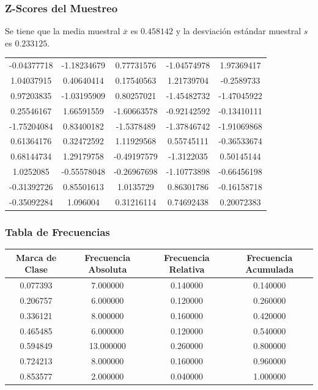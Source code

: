 \documentclass[12pt,a4paper]{article}
\begin{document}
    \subsubsection{Z-Scores del Muestreo}
        Se tiene que la media muestral $\overline{x}$ es $0.458142$ y la 
        desviación estándar muestral $s$ es $0.233125$.
        \begin{center}
            \begin{tabular}{ccccc}
                -0.04377718 & -1.18234679 &  0.77731576 & -1.04574978 &  1.97369417 \\
                 1.04037915 &  0.40640414 &  0.17540563 &  1.21739704 & -0.2589733  \\
                 0.97203835 & -1.03195909 &  0.80257021 & -1.45482732 & -1.47045922 \\
                 0.25546167 &  1.66591559 & -1.60663578 & -0.92142592 & -0.13410111 \\
                -1.75204084 &  0.83400182 & -1.5378489  & -1.37846742 & -1.91069868 \\
                 0.61364176 &  0.32472592 &  1.11929568 &  0.55745111 & -0.36533674 \\
                 0.68144734 &  1.29179758 & -0.49197579 & -1.3122035  &  0.50145144 \\
                 1.0252085  & -0.55578048 & -0.26967698 & -1.10773898 & -0.66456198 \\
                -0.31392726 &  0.85501613 &  1.0135729  &  0.86301786 & -0.16158718 \\
                -0.35092284 &  1.096004   &  0.31216114 &  0.74692438 &  0.20072383 \\
            \end{tabular}
        \end{center}

    \subsubsection{Tabla de Frecuencias}
        \begin{center}
            \begin{tabular}{|c|c|c|c|}
                \hline
                Marca de Clase & Frecuencia Absoluta & Frecuencia Relativa & Frecuencia Acumulada \\
                \hline
                0.077393 & 7.000000 & 0.140000 & 0.140000 \\
                0.206757 & 6.000000 & 0.120000 & 0.260000 \\
                0.336121 & 8.000000 & 0.160000 & 0.420000 \\
                0.465485 & 6.000000 & 0.120000 & 0.540000 \\
                0.594849 & 13.000000 & 0.260000 & 0.800000 \\
                0.724213 & 8.000000 & 0.160000 & 0.960000 \\
                0.853577 & 2.000000 & 0.040000 & 1.000000 \\
                \hline
            \end{tabular}
        \end{center}
\end{document}
